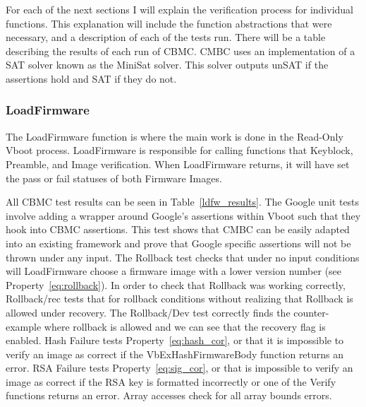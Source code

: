 \documentclass[../report.tex]{subfiles}
\begin{document}
For each of the next sections I will explain the verification process for individual functions. 
This explanation will include the function abstractions that were necessary, and a description of each of the tests run. 
There will be a table describing the results of each run of CBMC\@.
CMBC uses an implementation of a SAT solver known as the MiniSat solver\cite{minisat}.
This solver outputs unSAT if the assertions hold and SAT if they do not. 

\subsubsection{LoadFirmware}

The LoadFirmware function is where the main work is done in the Read-Only Vboot process.
LoadFirmware is responsible for calling functions that  Keyblock, Preamble, and Image verification.
When LoadFirmware returns, it will have set the pass or fail statuses of both Firmware Images.

All CBMC test results can be seen in Table~\ref{ldfw_results}. 
The Google unit tests involve adding a wrapper around Google's assertions within Vboot such that they hook into CBMC assertions.
This test shows that CMBC can be easily adapted into an existing framework and prove that Google specific assertions will not be thrown under any input.
The Rollback test checks that under no input conditions will LoadFirmware choose a firmware image with a lower version number (see Property~\ref{eq:rollback}).
In order to check that Rollback was working correctly, Rollback/rec tests that for rollback conditions without realizing that Rollback is allowed under recovery. 
The Rollback/Dev test correctly finds the counter-example where rollback is allowed and we can see that the recovery flag is enabled.
Hash Failure tests Property~\ref{eq:hash_cor}, or that it is impossible to verify an image as correct if the VbExHashFirmwareBody function returns an error.
RSA Failure tests Property~\ref{eq:sig_cor}, or that is impossible to verify an image as correct if the RSA key is formatted incorrectly or one of the Verify functions returns an error.
Array accesses check for all array bounds errors.
\end{document}
